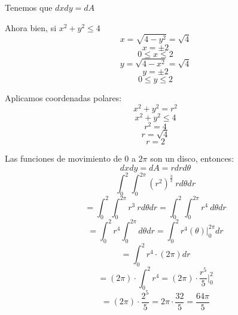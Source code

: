 Tenemos que $dxdy = dA$

Ahora bien, si $x^2 + y^2 \leq 4$
$$x = \sqrt{4 - y^2} = \sqrt{4}$$
$$x = \pm 2$$
$$0 \leq x \leq 2$$
$$y = \sqrt{4 - x^2} = \sqrt{4}$$
$$y = \pm 2$$
$$0 \leq y \leq 2$$

Aplicamos coordenadas polares:
$$x^2 + y^2 = r^2$$
$$x^2 + y^2 \leq 4$$
$$r^2 = 4$$
$$r = \sqrt{4}$$
$$r = 2$$

Las funciones de movimiento de $0$ a $2\pi$ son un disco, entonces:
$$dxdy = dA = rdrd\theta$$
$$\int_0^2\int_0^{2\pi} (r^2)^{\frac{3}{2}} \ rd\theta dr$$
$$= \int_0^2\int_0^{2\pi} r^3 \ rd\theta dr = \int_0^2\int_0^{2\pi} r^4 \ d\theta dr$$
$$= \int_0^2 r^4\int_0^{2\pi} d\theta dr = \int_0^2 r^4 (\theta)\big|_0^{2\pi} dr$$
$$= \int_0^2 r^4 \cdot (2\pi)dr$$
$$= (2\pi) \cdot \int_0^2 r^4 = (2\pi) \cdot \frac{r^5}{5}\Big|_0^2$$
$$= (2\pi) \cdot \frac{2^5}{5} = 2\pi \cdot \frac{32}{5} = \frac{64\pi}{5} $$ 
